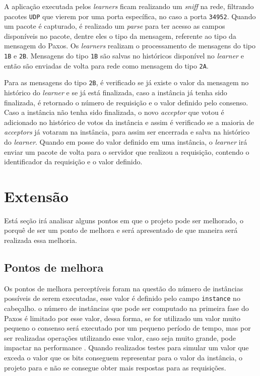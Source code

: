 \documentclass[
    12pt,
    openright, 
    oneside,
    a4paper,
    french,
    english,
    brazil
    ]{facom-ufu-abntex2}
\theoremstyle{definition}
\begin{document}
A aplicação executada pelos \emph{learners} ficam realizando um \emph{sniff} na rede, filtrando pacotes
\texttt{UDP} que vierem por uma porta específica, no caso a porta \texttt{34952}. Quando um
pacote é capturado, é realizado um \emph{parse} para ter acesso as campos disponíveis no pacote, dentre
eles o tipo da mensagem, referente ao tipo da mensagem do Paxos. Os \emph{learners} realizam o processamento
de mensagens do tipo \texttt{1B} e \texttt{2B}. Mensagens do tipo \texttt{1B} são salvas no históricos
disponível no \emph{learner} e então são enviadas de volta para rede como mensagem do tipo \texttt{2A}.

Para as mensagens do tipo \texttt{2B}, é verificado se já existe o valor da mensagem no histórico
do \emph{learner} e se já está finalizada, caso a instância já tenha sido finalizada, é retornado o
número de requisição e o valor definido pelo consenso. Caso a instância não tenha sido finalizada,
o novo \emph{acceptor} que votou é adicionado no histórico de votos da instância e assim é verificado
se a maioria de \emph{acceptors} já votaram na instância, para assim ser encerrada e salva na histórico
do \emph{learner}. Quando em posse do valor definido em uma instância, o \emph{learner} irá enviar um pacote de 
volta para o servidor que realizou a requisição, contendo o identificador da requisição e o valor definido.

\section{Extensão}
Está seção irá analisar alguns pontos em que o projeto pode ser melhorado, o porquê de ser um ponto de
melhora e será apresentado de que maneira será realizada essa melhoria.

\subsection{Pontos de melhora}
Os pontos de melhora perceptíveis foram na questão do número de instâncias possíveis de serem executadas,
esse valor é definido pelo campo \texttt{instance} no cabeçalho. o número de instâncias que pode ser 
computado na primeira fase do Paxos é limitado por esse valor, dessa forma, se for utilizado um valor
muito pequeno o consenso será executado por um pequeno período de tempo, mas por ser realizadas operações
utilizando esse valor, caso seja muito grande, pode impactar na performance \cite{dang2016paxos}. 
Quando realizados testes para simular um valor que exceda o valor que os bits conseguem representar 
para o valor da instância, o projeto para e não se consegue obter mais respostas para as requisições.
\end{document}
